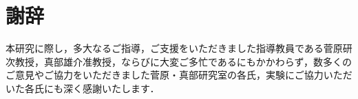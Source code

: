﻿\chapter*{謝辞}
本研究に際し，多大なるご指導，ご支援をいただきました指導教員である菅原研次教授，真部雄介准教授，ならびに大変ご多忙であるにもかかわらず，数多くのご意見やご協力をいただきました菅原・真部研究室の各氏，実験にご協力いただいた各氏にも深く感謝いたします．

